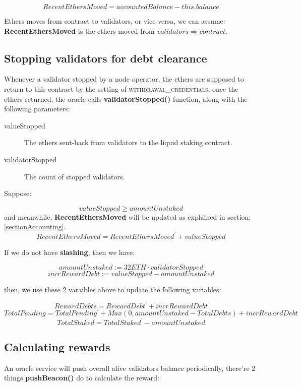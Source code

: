 \documentclass{article}
\begin{document}
\[RecentEthersMoved = accountedBalance - this.balance\]

Ethers moves from contract to validators, or vice versa, we can assume: \textbf{RecentEthersMoved} is the ethers moved from ${validators}\Longrightarrow{contract}$.

\subsection{Stopping validators for debt clearance}
Whenever a validator stopped by a node operator, the ethers are supposed to return to this contract by the setting of \textsc{withdrawal\_credentials}, once the ethers returned, the oracle calls \textbf{validatorStopped()} function, along with the following parameters:
\begin{description}
\item[valueStopped] The ethers sent-back from validators to the liquid staking contract.
\item[validatorStopped] The count of stopped validators.
\end{description}
Suppose:

\[valueStopped \geq amountUnstaked \]
and meanwhile, \textbf{RecentEthersMoved} will be updated as explained in section:\ref{sectionAccounting}.
\[RecentEthersMoved = RecentEthersMoved^{\prime} + valueStopped\]

If we do not have \textbf{slashing}, then we have:
\begin{lemma}
\[amountUnstaked := 32 ETH \cdot validatorStopped\]
\[incrRewardDebt := valueStopped - amountUnstaked\]
\end{lemma}

then, we use these 2 varaibles above to update the following variables:
\begin{theorem}
\label{validatorStopped}
\[RewardDebts = RewardDebt^{\prime} + incrRewardDebt\]
\[TotalPending = TotalPending^{\prime} + Max(0, amountUnstaked - TotalDebts) + incrRewardDebt\]
\[TotalStaked = TotalStaked^{\prime} -  amountUnstaked \]
\end{theorem}

\subsection{Calculating rewards}
An oracle service will push overall alive validators balance periodically, there're 2 things \textbf{pushBeacon()} do to calculate the reward:
\end{document}
